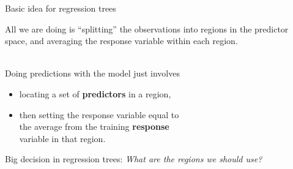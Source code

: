 \documentclass[mathserif, aspectratio=169]{beamer}
\begin{document}
\begin{frame}{Basic idea for regression trees}

\begin{center}
All we are doing is ``splitting'' the observations into regions in the predictor space, and averaging the response variable within each region.\\~\\
\pause
\end{center}

Doing predictions with the model just involves 
\begin{itemize}
\item locating a set of \textbf{predictors} in a region, 
\item then setting the response variable equal to\\ the average from the training \textbf{response}\\ variable in that region.  
\end{itemize}
\pause

\vspace{5mm}

Big decision in regression trees: \textit{What are the regions we should use?}
\end{frame}
\end{document}
